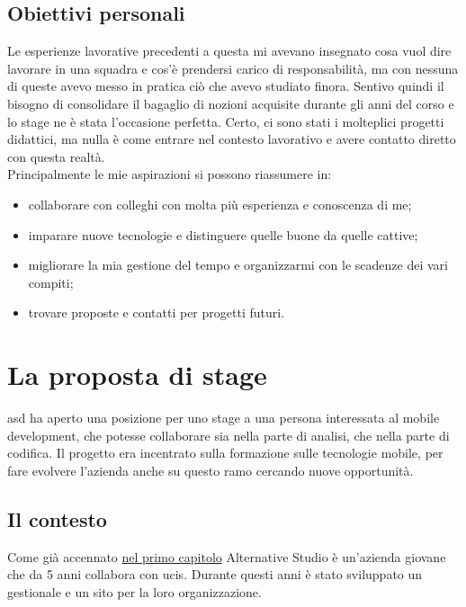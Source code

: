 \subsection{Obiettivi personali}
\label{sec:obiettivi-pers}
Le esperienze lavorative precedenti a questa mi avevano insegnato cosa vuol dire lavorare in una squadra e cos'è prendersi carico
di responsabilità, ma con nessuna di queste avevo messo in pratica ciò che avevo studiato finora. Sentivo quindi il bisogno di consolidare
il bagaglio di nozioni acquisite durante gli anni del corso e lo stage ne è stata l'occasione perfetta. Certo, ci sono stati i molteplici
progetti didattici, ma nulla è come entrare nel contesto lavorativo e avere contatto diretto con questa realtà. \\
Principalmente le mie aspirazioni si possono riassumere in:
\begin{itemize}
	\item collaborare con colleghi con molta più esperienza e conoscenza di me;
	\item imparare nuove tecnologie e distinguere quelle buone da quelle cattive;
	\item migliorare la mia gestione del tempo e organizzarmi con le scadenze dei vari compiti;
	\item trovare proposte e contatti per progetti futuri.
\end{itemize}


\section{La proposta di stage}

\acrlong{asd} ha aperto una posizione per uno stage a una persona interessata al mobile development, che potesse collaborare sia nella parte di analisi, che nella parte di codifica. Il progetto era incentrato sulla formazione sulle tecnologie mobile, per fare evolvere l'azienda anche su questo ramo cercando nuove opportunità.

\subsection{Il contesto}

Come già accennato {\hyperref[cap:introduzione]{nel primo capitolo}} Alternative Studio è un'azienda giovane che da 5 anni collabora con
\gls{ucis}. Durante questi anni è stato sviluppato un gestionale e un sito per la loro organizzazione.

